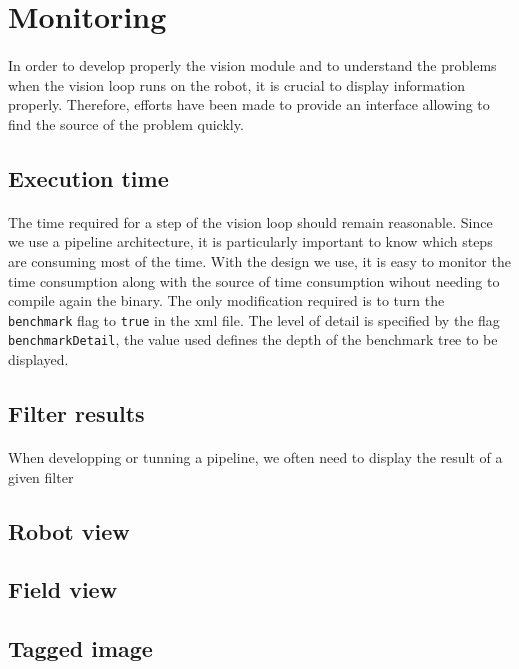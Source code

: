 \documentclass[a4paper,12pt]{article}
\begin{document}
\section{Monitoring}
\paragraph{}
In order to develop properly the vision module and to understand the problems
when the vision loop runs on the robot, it is crucial to display information
properly. Therefore, efforts have been made to provide an interface allowing to
find the source of the problem quickly.

\subsection{Execution time}
\paragraph{}
The time required for a step of the vision loop should remain reasonable. Since
we use a pipeline architecture, it is particularly important to know which steps
are consuming most of the time. With the design we use, it is easy to monitor
the time consumption along with the source of time consumption wihout needing
to compile again the binary. The only modification required is to turn the
\verb!benchmark! flag to \verb!true! in the xml file. The level of detail is
specified by the flag \verb!benchmarkDetail!, the value used defines the depth
of the benchmark tree to be displayed.

\subsection{Filter results}
\paragraph{}
When developping or tunning a pipeline, we often need to display the result of a
given filter

\subsection{Robot view}
\subsection{Field view}
\subsection{Tagged image}
\end{document}
